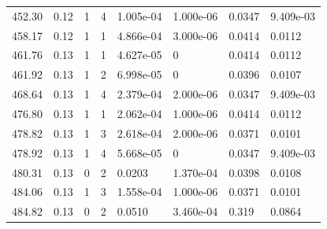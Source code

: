 \documentclass[preview]{standalone}
\begin{document}
{{{\begin{tabular}{L{1.2cm}C{1.2cm} C{0.3cm}C{0.5cm} C{1.4cm}C{1.4cm} C{1.4cm}C{1.4cm}}
  452.30  &  0.12  & 1     &  4 &  1.005e-04  & 1.000e-06  & 0.0347 &  9.409e-03   \\ 
  458.17  &  0.12  & 1     &  1 &  4.866e-04  & 3.000e-06  & 0.0414 &  0.0112   \\ 
  461.76  &  0.13  & 1     &  1 &  4.627e-05  & 0  & 0.0414 &  0.0112   \\ 
  461.92  &  0.13  & 1     &  2 &  6.998e-05  & 0  & 0.0396 &  0.0107   \\ 
  468.64  &  0.13  & 1     &  4 &  2.379e-04  & 2.000e-06  & 0.0347 &  9.409e-03   \\ 
  476.80  &  0.13  & 1     &  1 &  2.062e-04  & 1.000e-06  & 0.0414 &  0.0112   \\ 
  478.82  &  0.13  & 1     &  3 &  2.618e-04  & 2.000e-06  & 0.0371 &  0.0101   \\ 
  478.92  &  0.13  & 1     &  4 &  5.668e-05  & 0  & 0.0347 &  9.409e-03   \\ 
  480.31  &  0.13  & 0     &  2 &  0.0203  & 1.370e-04  & 0.0398 &  0.0108   \\ 
  484.06  &  0.13  & 1     &  3 &  1.558e-04  & 1.000e-06  & 0.0371 &  0.0101   \\ 
  484.82  &  0.13  & 0     &  2 &  0.0510  & 3.460e-04  & 0.319 &  0.0864   \\ 
\hline 
\end{tabular} 

}}}
\end{document}
